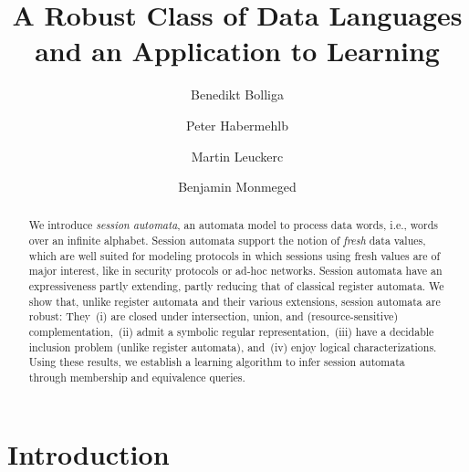 \documentclass{LMCS}
\begin{document}
\title[A Robust Class of Data Languages and an Application to Learning]{A Robust Class of Data Languages and an Application to Learning\rsuper*}

\author[B.~Bollig]{Benedikt Bollig\rsuper a}
\address{{\lsuper a}LSV, ENS Cachan, CNRS \& Inria, France}

\author[P.~Habermehl]{Peter Habermehl\rsuper b}
\address{{\lsuper b}Univ Paris Diderot, Sorbonne Paris Cit\'e, LIAFA, CNRS, France}

\author[M.~Leucker]{Martin Leucker\rsuper c}
\address{{\lsuper c}ISP, University of L\"ubeck, Germany}

\author[B.~Monmege]{Benjamin Monmege\rsuper d}
\address{{\lsuper d}Universit{\'e} Libre de Bruxelles, Belgium}


\begin{abstract}
\noindent
  We introduce \emph{session automata}, an automata model to process data words, i.e., words over an infinite alphabet.
  Session automata support the notion of \emph{fresh} data
  values, which are well suited for modeling protocols in which sessions using
  fresh values are of major interest, like in security protocols or
  ad-hoc networks. Session automata have an expressiveness partly extending, partly reducing that of
  classical register automata. We show that, unlike register automata and their various extensions, session automata are robust: They
\,(i) are closed under intersection, union, and (resource-sensitive) complementation,
  \,(ii) admit a symbolic regular representation,
  \,(iii) have a decidable inclusion problem
    (unlike register automata), and
  \,(iv) enjoy logical characterizations.
Using these results, we establish a learning algorithm to infer
  session automata through membership and equivalence queries.
\end{abstract}

\maketitle

\section{Introduction}
\end{document}
